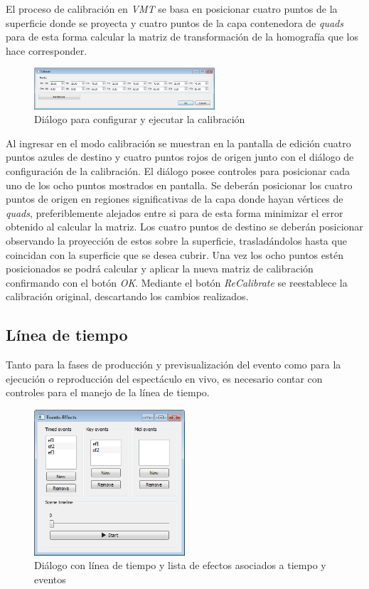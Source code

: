 El proceso de calibración en \emph{VMT} se basa en posicionar cuatro puntos de la superficie donde se proyecta y cuatro puntos de la capa contenedora de \emph{quads} para de esta forma calcular la matriz de transformación de la homografía que los hace corresponder.

\begin{figure}[H]
  \centering
    \includegraphics[width=0.6\textwidth]{./Cap5_vmt/vmt_Calibrate.png}
  \caption{Diálogo para configurar y ejecutar la calibración}
  \label{fig:VMT-Calib}
\end{figure}

Al ingresar en el modo calibración se muestran en la pantalla de edición cuatro puntos azules de destino y cuatro puntos rojos de origen junto con el diálogo de configuración de la calibración.
El diálogo posee controles para posicionar cada uno de los ocho puntos mostrados en pantalla. Se deberán posicionar los cuatro puntos de origen en regiones significativas de la capa donde hayan vértices de \emph{quads}, preferiblemente alejados entre si para de esta forma minimizar el error obtenido al calcular la matriz.
Los cuatro puntos de destino se deberán posicionar observando la proyección de estos sobre la superficie, trasladándolos hasta que coincidan con la superficie que se desea cubrir. Una vez los ocho puntos estén posicionados se podrá calcular y aplicar la nueva matriz de calibración confirmando con el botón \emph{OK}.
Mediante el botón \emph{ReCalibrate} se reestablece la calibración original, descartando los cambios realizados.

\subsection{Línea de tiempo}

Tanto para la fases de producción y previsualización del evento como para la ejecución o reproducción del espectáculo en vivo, es necesario contar con controles para el manejo de la línea de tiempo.

\begin{figure}[H]
  \centering
    \includegraphics[width=0.5\textwidth]{./Cap5_vmt/vmt_events_effects.png}
  \caption{Diálogo con línea de tiempo y lista de efectos asociados a tiempo y eventos}
  \label{fig:VMT-Timeline}
\end{figure}

